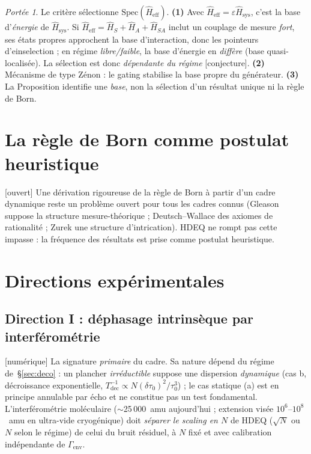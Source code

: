 \documentclass[11pt,a4paper]{article}
\newcommand{\Hsysop}{\hat{H}_{\mathrm{sys}}}
\newcommand{\Heff}{\hat{H}_{\mathrm{eff}}}
\newcommand{\statut}[1]{{\footnotesize\textsf{[#1]}}}
\theoremstyle{plain}
\theoremstyle{definition}
\theoremstyle{remark}
\newtheorem*{scope}{Port\'ee}
\begin{document}
\begin{scope}
Le crit\`ere s\'electionne $\mathrm{Spec}(\Heff)$. \textbf{(1)} Avec
$\Heff=\varepsilon\Hsysop$, c'est la base d'\emph{\'energie} de $\Hsysop$. Si
$\Heff=\hat H_S+\hat H_A+\hat H_{SA}$ inclut un couplage de mesure \emph{fort}, ses
\'etats propres approchent la base d'interaction, donc les pointeurs d'einselection ;
en r\'egime \emph{libre/faible}, la base d'\'energie en \emph{diff\`ere} (base
quasi-localis\'ee). La s\'election est donc \emph{d\'ependante du r\'egime}
\statut{conjecture}. \textbf{(2)} M\'ecanisme de type Zénon : le gating stabilise la
base propre du g\'en\'erateur. \textbf{(3)} La Proposition identifie une \emph{base},
non la s\'election d'un r\'esultat unique ni la r\`egle de Born.
\end{scope}

\section{La r\`egle de Born comme postulat heuristique}
\statut{ouvert} Une d\'erivation rigoureuse de la r\`egle de Born \`a partir d'un cadre
dynamique reste un probl\`eme ouvert pour tous les cadres connus (Gleason suppose la
structure mesure-th\'eorique ; Deutsch--Wallace des axiomes de rationalit\'e ; Zurek une
structure d'intrication). HDEQ ne rompt pas cette impasse : la fr\'equence des
r\'esultats est prise comme postulat heuristique.

\section{Directions exp\'erimentales}\label{sec:exp}
\subsection{Direction I : d\'ephasage intrins\`eque par interf\'erom\'etrie}
\statut{num\'erique} La signature \emph{primaire} du cadre. Sa nature d\'epend du r\'egime
de~\S\ref{sec:deco} : un plancher \emph{irr\'eductible} suppose une dispersion
\emph{dynamique} (cas b, d\'ecroissance exponentielle, $T_{\mathrm{dec}}^{-1}\propto
N(\delta\tau_0)^2/\tau_0^3$) ; le cas statique (a) est en principe annulable par \'echo
et ne constitue pas un test fondamental. L'interf\'erom\'etrie mol\'eculaire ($\sim$25\,000~amu
aujourd'hui ; extension vis\'ee $10^6$--$10^8$~amu en ultra-vide cryog\'enique) doit
\emph{s\'eparer le scaling en $N$} de HDEQ ($\sqrt N$ ou $N$ selon le r\'egime) de celui
du bruit r\'esiduel, \`a $N$ fix\'e et avec calibration ind\'ependante de $\Gamma_{\mathrm{env}}$.
\end{document}
